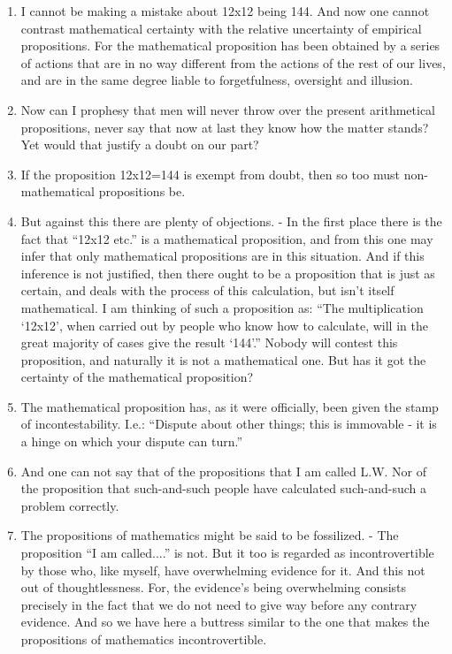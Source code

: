 \documentclass{book}
\begin{document}
\begin{enumerate}
\item
I cannot be making a mistake about 12x12 being 144. And now one cannot contrast
mathematical certainty with the relative uncertainty of empirical propositions.
For the mathematical proposition has been obtained by a series of actions that
are in no way different from the actions of the rest of our lives, and are in
the same degree liable to forgetfulness, oversight and illusion.

\item
Now can I prophesy that men will never throw over the present arithmetical
propositions, never say that now at last they know how the matter stands? Yet
would that justify a doubt on our part?

\item
If the proposition 12x12=144 is exempt from doubt, then so too must
non-mathematical propositions be.

\item
But against this there are plenty of objections. - In the first place there
is the fact that ``12x12 etc.'' is a mathematical proposition, and from this
one may infer that only mathematical propositions are in this situation. And if
this inference is not justified, then there ought to be a proposition that is
just as certain, and deals with the process of this calculation, but isn't
itself mathematical. I am thinking of such a proposition as: ``The
multiplication `12x12', when carried out by people who know how to calculate,
will in the great majority of cases give the result `144'.'' Nobody will
contest this proposition, and naturally it is not a mathematical one. But has
it got the certainty of the mathematical proposition?

\item
The mathematical proposition has, as it were officially, been given the stamp
of incontestability. I.e.: ``Dispute about other things; this is immovable - it
is a hinge on which your dispute can turn.''

\item
And one can not say that of the propositions that I am called L.W. Nor of the
proposition that such-and-such people have calculated such-and-such a problem
correctly.

\item
The propositions of mathematics might be said to be fossilized. - The
proposition ``I am called....'' is not. But it too is regarded as
incontrovertible by those who, like myself, have overwhelming evidence for it.
And this not out of thoughtlessness. For, the evidence's being overwhelming
consists precisely in the fact that we do not need to give way before any
contrary evidence. And so we have here a buttress similar to the one that makes
the propositions of mathematics incontrovertible.


\end{enumerate}
\end{document}
